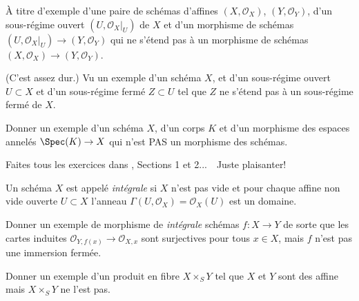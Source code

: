 \begin{exercise}
\label{exercise-morphism-does-not-extend}
À titre d'exemple d'une paire de schémas
d'affines $(X, {\mathcal O}_X)$, $(Y, {\mathcal O}_Y)$, d'un
sous-régime ouvert $(U, {\mathcal O}_X|_U)$ de $X$
et d'un morphisme de schémas
$(U, {\mathcal O}_X|_U) \to (Y, {\mathcal O}_Y)$ qui
ne s'étend pas à un morphisme de
schémas $(X, {\mathcal O}_X) \to (Y, {\mathcal O}_Y)$.
\end{exercise}

\begin{exercise}
\label{exercise-closed-subscheme-does-not-extend}
(C'est assez dur.) Vu
un exemple d'un schéma $X$, et d'un sous-régime ouvert $U \subset X$ et
d'un sous-régime fermé $Z \subset U$ tel que $Z$ ne s'étend pas
à un sous-régime fermé de $X$.
\end{exercise}

\begin{exercise}
\label{exercise-not-morphism-schemes}
Donner un exemple d'un schéma $X$, d'un corps $K$ et
d'un morphisme des espaces annelés $\Spec(K) \to X$ qui
n'est PAS un morphisme des schémas.
\end{exercise}

\begin{exercise}
\label{exercise-just-kidding}
Faites tous les exercices dans \cite[Chapter II]{H}, Sections
1 et 2...\ \ Juste plaisanter!
\end{exercise}

\begin{definition}
\label{definition-integral}
Un schéma $X$ est appelé {\it intégrale} si $X$ n'est pas
vide et pour chaque affine non vide ouverte $U
\subset X$ l'anneau $\Gamma(U, \mathcal{O}_X) = \mathcal{O}_X(U)$ est un domaine.
\end{definition}

\begin{exercise}
\label{exercise-morphism-integral-schemes-surjective-stalks-not-closed}
Donner un exemple de morphisme de {\it intégrale} schémas
$f : X \to Y$ de sorte que les cartes induites ${\mathcal O}_{Y, f(x)}
\to {\mathcal O}_{X, x}$ sont surjectives pour tous $x\in X$, mais $f$
n'est pas une immersion fermée.
\end{exercise}

\begin{exercise}
\label{exercise-fibre-product-affines-not-affine}
Donner un exemple d'un produit en fibre $X \times_S Y$ tel que $X$ et $Y$ sont
des affine mais $X \times_S Y$ ne l'est pas.
\end{exercise}

